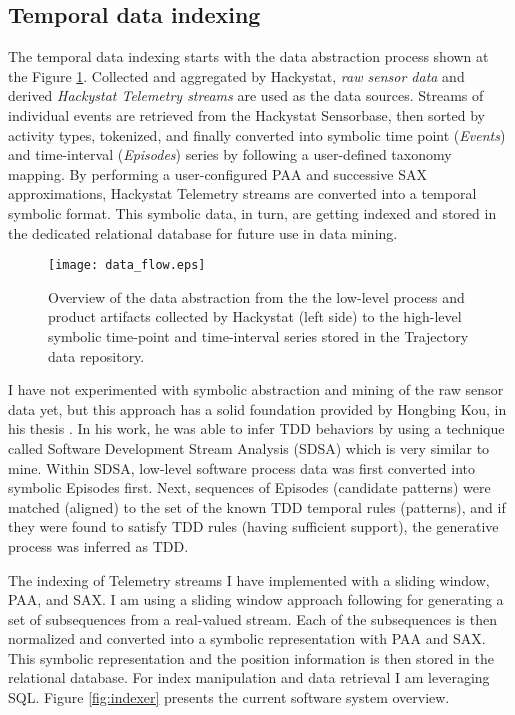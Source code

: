 \subsection{Temporal data indexing} \label{indexing}
The temporal data indexing starts with the data abstraction process shown at the Figure \ref{fig:data_flow}. Collected and aggregated by Hackystat, \textit{raw sensor data} and derived \textit{Hackystat Telemetry streams} are used as the data sources. Streams of individual events are retrieved from the Hackystat Sensorbase, then sorted by activity types, tokenized, and finally converted into symbolic time point (\textit{Events}) and time-interval (\textit{Episodes}) series by following a user-defined taxonomy mapping. By performing a user-configured PAA and successive SAX approximations, Hackystat Telemetry streams are converted into a temporal symbolic format. This symbolic data, in turn, are getting indexed and stored in the dedicated relational database for future use in data mining.

\begin{figure}[tbp]
   \centering
   \texttt{[image: data\_flow.eps]}
   \caption{Overview of the data abstraction from the the low-level process and product artifacts collected by Hackystat (left side) to the high-level symbolic time-point and time-interval series stored in the Trajectory data repository.}
   \label{fig:data_flow}
\end{figure}

I have not experimented with symbolic abstraction and mining of the raw sensor data yet, but this approach has a solid foundation provided by Hongbing Kou, in his thesis \cite{citeulike:2703162}. In his work, he was able to infer TDD behaviors by using a technique called Software Development Stream Analysis (SDSA) which is very similar to mine. Within SDSA, low-level software process data was first converted into symbolic Episodes first. Next, sequences of Episodes (candidate patterns) were matched (aligned) to the set of the known TDD temporal rules (patterns), and if they were found to satisfy TDD rules (having sufficient support), the generative process was inferred as TDD.

The indexing of Telemetry streams I have implemented with a sliding window, PAA, and SAX. I am using a sliding window approach following \cite{citeulike:2821475} for generating a set of subsequences from a real-valued stream. Each of the subsequences is then normalized and converted into a symbolic representation with PAA and SAX. This symbolic representation and the position information is then stored in the relational database. For index manipulation and data retrieval I am leveraging SQL. Figure \ref{fig:indexer} presents the current software system overview.

